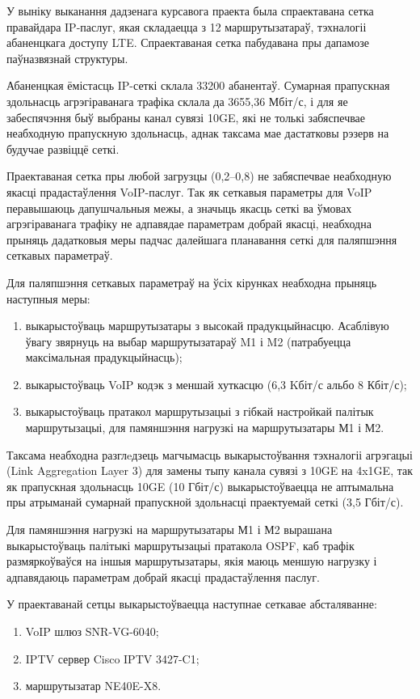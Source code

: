 
У выніку выканання дадзенага курсавога праекта была спраектавана
сетка правайдара IP-паслуг, якая складаецца з 12 маршрутызатараў,
тэхналогіі абаненцкага доступу LTE. Спраектаваная сетка пабудавана
пры дапамозе паўназвязнай структуры.

Абаненцкая ёмістасць IP-сеткі склала 33200 абанентаў.
Сумарная прапускная здольнасць агрэгіраванага трафіка склала да
3655,36 Мбіт/с, і для яе забеспячэння быў выбраны канал сувязі 10GE,
які не толькі забяспечвае неабходную прапускную здольнасць, аднак
таксама мае дастатковы рэзерв на будучае развіццё сеткі.

Праектаваная сетка пры любой загрузцы (0,2--0,8) не забяспечвае
неабходную якасці прадастаўлення VoIP-паслуг.
Так як сеткавыя параметры для VoIP перавышаюць дапушчальныя межы,
а значыць якасць сеткі ва ўмовах агрэгіраванага трафіку не адпавядае
параметрам добрай якасці,
неабходна прыняць дадатковыя меры падчас далейшага планавання
сеткі для паляпшэння сеткавых параметраў.

Для паляпшэння сеткавых параметраў на ўсіх кірунках неабходна
прыняць наступныя меры:
\begin{enumerate}
    \item выкарыстоўваць маршрутызатары з высокай прадукцыйнасцю.
          Асаблівую ўвагу звярнуць на выбар маршрутызатараў
          M1 і M2 (патрабуецца максімальная прадукцыйнасць);
    \item выкарыстоўваць VoIP кодэк з меншай хуткасцю (6,3 Kбіт/с альбо 8 Кбіт/с);
    \item выкарыстоўваць пратакол маршрутызацыі з гібкай настройкай
          палітык маршрутызацыі, для памяншэння нагрузкі на
          маршрутызатары М1 і М2.
\end{enumerate}

Таксама неабходна разглeдзець магчымасць выкарыстоўвання тэхналогіі
агрэгацыі (Link Aggregation Layer 3) для замены тыпу канала сувязі з
10GE на 4x1GE, так як прапускная здольнасць
10GE (10 Гбіт/с) выкарыстоўваецца
не аптымальна пры атрыманай сумарнай прапускной здольнасці
праектуемай сеткі (3,5 Гбіт/с).

Для памяншэння нагрузкі на маршрутызатары М1 і М2 вырашана
выкарыстоўваць палітыкі маршрутызацыі пратакола OSPF, каб
трафік размяркоўваўся на іншыя маршрутызатары, якія
маюць меншую нагрузку і адпавядаюць параметрам добрай якасці
прадастаўлення паслуг.

У праектаванай сетцы выкарыстоўваецца наступнае сеткавае
абсталяванне:
\begin{enumerate}
    \item VoIP шлюз SNR-VG-6040;
    \item IPTV сервер Cisco IPTV 3427-C1;
    \item маршрутызатар NE40E-X8.
\end{enumerate}

